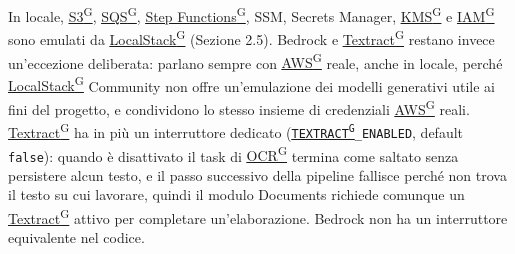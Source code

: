 \documentclass[a4paper,12pt]{article}
\providecommand{\glslink}[2]{\href{https://alittlebyte-19.github.io/Documentazione/glossario.html\#gls-#1}{\underline{#2}\textsuperscript{\scriptsize G}}}
\begin{document}
In locale, \glslink{s3-simple-storage-service}{S3}, \glslink{sqs-simple-queue-service}{SQS}, \glslink{step-functions}{Step Functions}, SSM, Secrets Manager, \glslink{kms-key-management-service}{KMS} e \glslink{iam-identity-and-access-management}{IAM} sono emulati da \glslink{localstack}{LocalStack} (Sezione 2.5). Bedrock e \glslink{textract}{Textract} restano invece un'eccezione deliberata: parlano sempre con \glslink{aws}{AWS} reale, anche in locale, perché \glslink{localstack}{LocalStack} Community non offre un'emulazione dei modelli generativi utile ai fini del progetto, e condividono lo stesso insieme di credenziali \glslink{aws}{AWS} reali. \glslink{textract}{Textract} ha in più un interruttore dedicato (\texttt{\glslink{textract}{TEXTRACT}\_ENABLED}, default \texttt{false}): quando è disattivato il task di \glslink{ocr-riconoscimento-ottico-dei-caratteri}{OCR} termina come saltato senza persistere alcun testo, e il passo successivo della pipeline fallisce perché non trova il testo su cui lavorare, quindi il modulo Documents richiede comunque un \glslink{textract}{Textract} attivo per completare un'elaborazione. Bedrock non ha un interruttore equivalente nel codice.
\end{document}
